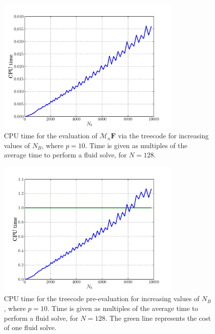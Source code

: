 \documentclass[preprint,12pt]{elsarticle}
\newcommand{\B}[1]{\mathbf{#1}}
\newcommand{\C}[1]{\mathcal{#1}}
\newcommand{\StandardFigureWidth}{3.5375in}%
\begin{document}
\begin{figure}[!b]
	\begin{center}
		\includegraphics[bb=0in 0in 7.7in 6.3in,width=\StandardFigureWidth,clip]{Benchmark_Nb_EvalTime.pdf}
	\end{center}
	\caption{CPU time for the evaluation of $\C{M}_n\B{F}$ via the treecode for increasing values of $N_B$, where $p=10$. Time is given as multiples of the average time to perform a fluid solve, for $N=128$.}
	\label{fig:Benchmark_Nb_EvalTime}
\end{figure}

\begin{figure}[!b]
	\begin{center}
		\includegraphics[bb=0in 0in 7.7in 6.3in,width=\StandardFigureWidth,clip]{Benchmark_Nb_PreEvalTime.pdf}
	\end{center}
	\caption{CPU time for the treecode pre-evaluation for increasing values of $N_B$, where $p=10$. Time is given as multiples of the average time to perform a fluid solve, for $N=128$. The green line represents the cost of one fluid solve.}
	\label{fig:Benchmark_Nb_PreEvalTime}
\end{figure}
\end{document}
